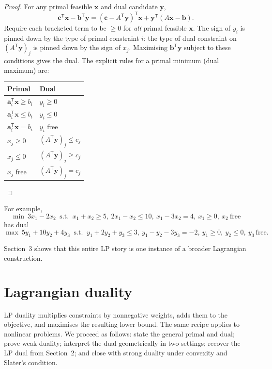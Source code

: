 \documentclass[11pt,a4paper]{article}
\begin{document}
\begin{proof}
For any primal feasible $\mathbf{x}$ and dual candidate $\mathbf{y}$,
\[
  \mathbf{c}^{\mathsf T}\mathbf{x}-\mathbf{b}^{\mathsf T}\mathbf{y}
  = (\mathbf{c}-A^{\mathsf T}\mathbf{y})^{\mathsf T}\mathbf{x}
    + \mathbf{y}^{\mathsf T}(A\mathbf{x}-\mathbf{b}).
\]
Require each bracketed term to be $\ge 0$ for \emph{all} primal feasible $\mathbf{x}$.
The sign of $y_i$ is pinned down by the type of primal constraint $i$;
the type of dual constraint on $(A^{\mathsf T}\mathbf{y})_j$ is pinned down by the sign of $x_j$.
Maximising $\mathbf{b}^{\mathsf T}\mathbf{y}$ subject to these conditions gives the dual.
The explicit rules for a primal minimum (dual maximum) are:
\begin{center}
\renewcommand{\arraystretch}{1.2}
\begin{tabular}{ll}
\toprule
\textbf{Primal} & \textbf{Dual} \\
\midrule
$\mathbf{a}_i^{\mathsf T}\mathbf{x}\ge b_i$ & $y_i\ge 0$ \\
$\mathbf{a}_i^{\mathsf T}\mathbf{x}\le b_i$ & $y_i\le 0$ \\
$\mathbf{a}_i^{\mathsf T}\mathbf{x}= b_i$ & $y_i$ free \\
$x_j\ge 0$ & $(A^{\mathsf T}\mathbf{y})_j\le c_j$ \\
$x_j\le 0$ & $(A^{\mathsf T}\mathbf{y})_j\ge c_j$ \\
$x_j$ free & $(A^{\mathsf T}\mathbf{y})_j= c_j$ \\
\bottomrule
\end{tabular}
\end{center}
\end{proof}

For example,
\[
  \min\ 3x_1-2x_2\ \text{ s.t. }\
  x_1+x_2\ge 5,\ 2x_1-x_2\le 10,\ x_1-3x_2=4,\ x_1\ge 0,\ x_2\ \text{free}
\]
has dual
\[
  \max\ 5y_1+10y_2+4y_3\ \text{ s.t. }\
  y_1+2y_2+y_3\le 3,\ y_1-y_2-3y_3=-2,\ y_1\ge 0,\ y_2\le 0,\ y_3\ \text{free}.
\]

Section~3 shows that this entire LP story is one instance of a broader Lagrangian construction.

\section{Lagrangian duality}

LP duality multiplies constraints by nonnegative weights, adds them to the objective, and maximises the
resulting lower bound.
The same recipe applies to nonlinear problems.
We proceed as follows: state the general primal and dual; prove weak duality; interpret the dual
geometrically in two settings; recover the LP dual from Section~2; and close with strong duality under
convexity and Slater's condition.
\end{document}
